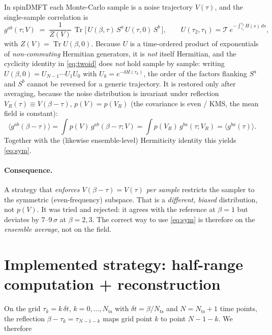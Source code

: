 \documentclass[11pt]{article}
\newcommand{\g}{g}
\newcommand{\Tr}{\operatorname{Tr}}
\newcommand{\bt}{\beta}
\begin{document}
In spinDMFT each Monte-Carlo sample is a noise trajectory $V(\tau)$, and the
single-sample correlation is
\begin{equation}
  \g^{ab}(\tau;V) \;=\; \frac{1}{Z(V)}\,
  \Tr\!\big[\,U(\bt,\tau)\,S^a\,U(\tau,0)\,S^b\,\big],
  \qquad
  U(\tau_2,\tau_1)=\mathcal{T}\,e^{-\int_{\tau_1}^{\tau_2} H(s)\,ds},
\end{equation}
with $Z(V)=\Tr U(\bt,0)$. Because $U$ is a time-ordered product of exponentials of
\emph{non-commuting} Hermitian generators, it is \emph{not} itself Hermitian, and the
cyclicity identity in \eqref{eq:twoid} does \emph{not} hold sample by sample: writing
$U(\bt,0)=U_{N-1}\cdots U_1U_0$ with $U_k=e^{-\delta H(\tau_k)}$, the order of the
factors flanking $S^a$ and $S^b$ cannot be reversed for a generic trajectory. It is
restored only after averaging, because the noise distribution is invariant under
reflection $V_R(\tau)\equiv V(\bt-\tau)$, $p(V)=p(V_R)$ (the covariance is even / KMS,
the mean field is constant):
\begin{equation}
  \langle \g^{ab}(\bt-\tau)\rangle
  = \int\! p(V)\,\g^{ab}(\bt-\tau;V)
  = \int\! p(V_R)\,\g^{ba}(\tau;V_R)
  = \langle \g^{ba}(\tau)\rangle .
\end{equation}
Together with the (likewise ensemble-level) Hermiticity identity this yields
\eqref{eq:sym}.

\paragraph{Consequence.} A strategy that \emph{enforces $V(\bt-\tau)=V(\tau)$ per
sample} restricts the sampler to the symmetric (even-frequency) subspace. That is a
\emph{different, biased} distribution, not $p(V)$. It was tried and rejected: it
agrees with the reference at $\bt=1$ but deviates by $7$--$9\,\sigma$ at $\bt=2,3$.
The correct way to use \eqref{eq:sym} is therefore on the \emph{ensemble average}, not
on the field.

\section{Implemented strategy: half-range computation + reconstruction}

On the grid $\tau_k=k\,\delta t$, $k=0,\dots,N_{\mathrm{ts}}$ with
$\delta t=\bt/N_{\mathrm{ts}}$ and $N=N_{\mathrm{ts}}+1$ time points, the reflection
$\bt-\tau_k=\tau_{N-1-k}$ maps grid point $k$ to point $N-1-k$. We therefore
\end{document}
